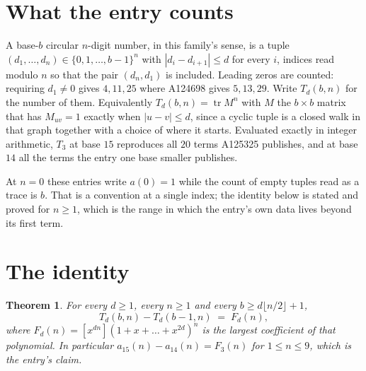 \documentclass[11pt,a4paper]{article}
\theoremstyle{plain}
\newtheorem{theorem}{Theorem}
\theoremstyle{definition}
\begin{document}
\section{What the entry counts}

A base-$b$ circular $n$-digit number, in this family's sense, is a tuple
$(d_1,\dots,d_n)\in\{0,1,\dots,b-1\}^{n}$ with $|d_i-d_{i+1}|\le d$ for every $i$, indices
read modulo $n$ so that the pair $(d_n,d_1)$ is included. Leading zeros are counted: requiring
$d_1\ne0$ gives $4,11,25$ where A124698 gives $5,13,29$. Write $T_d(b,n)$ for the number of
them. Equivalently $T_d(b,n)=\operatorname{tr}M^{n}$ with $M$ the $b\times b$ matrix that has
$M_{uv}=1$ exactly when $|u-v|\le d$, since a cyclic tuple is a closed walk in that graph
together with a choice of where it starts. Evaluated exactly in integer arithmetic, $T_{3}$
at base $15$ reproduces all $20$ terms A125325 publishes, and at base $14$ all the
terms the entry one base smaller publishes.

At $n=0$ these entries write $a(0)=1$ while the count of empty tuples read as a trace is $b$.
That is a convention at a single index; the identity below is stated and proved for $n\ge1$,
which is the range in which the entry's own data lives beyond its first term.

\section{The identity}

\begin{theorem}
For every $d\ge1$, every $n\ge1$ and every $b\ge d\lfloor n/2\rfloor+1$,
\[
T_d(b,n)-T_d(b-1,n)\;=\;F_d(n),
\]
where $F_d(n)=[x^{dn}](1+x+\dots+x^{2d})^{n}$ is the largest coefficient of that
polynomial. In particular $a_{15}(n)-a_{14}(n)=F_{3}(n)$ for $1\le n\le9$, which
is the entry's claim.
\end{theorem}
\end{document}
